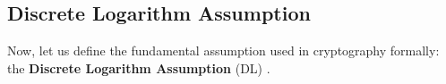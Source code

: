 \documentclass[../lecture-notes-148x210.tex]{subfiles}
\begin{document}





\subsection{Discrete Logarithm Assumption}

Now, let us define the fundamental assumption used in cryptography formally: the \textbf{Discrete Logarithm Assumption} (DL) \cite[chapter 16]{Dan_Boneh_2023}.
\end{document}
